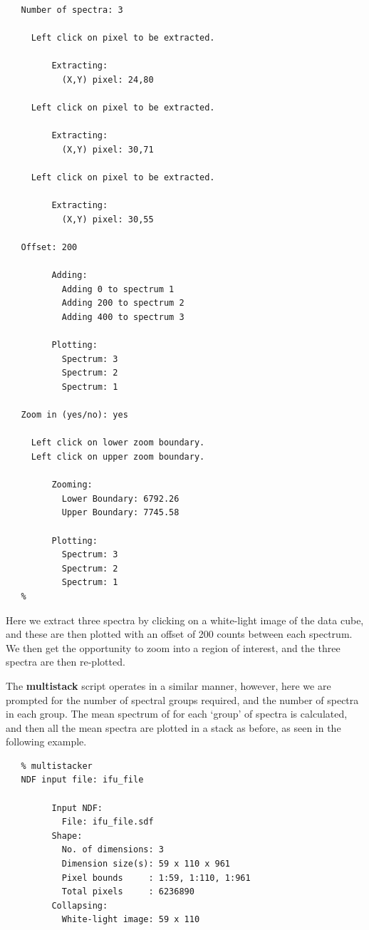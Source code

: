 \documentclass[twoside,11pt]{article}
\begin{document}
{\begin{verbatim}
   Number of spectra: 3
 
     Left click on pixel to be extracted.
 
         Extracting:
           (X,Y) pixel: 24,80
 
     Left click on pixel to be extracted.
 
         Extracting:
           (X,Y) pixel: 30,71
 
     Left click on pixel to be extracted.
 
         Extracting:
           (X,Y) pixel: 30,55
 
   Offset: 200
 
         Adding:
           Adding 0 to spectrum 1
           Adding 200 to spectrum 2
           Adding 400 to spectrum 3
 
         Plotting:
           Spectrum: 3 
           Spectrum: 2 
           Spectrum: 1 
 
   Zoom in (yes/no): yes
 
     Left click on lower zoom boundary.
     Left click on upper zoom boundary.
 
         Zooming:
           Lower Boundary: 6792.26
           Upper Boundary: 7745.58
 
         Plotting:
           Spectrum: 3
           Spectrum: 2
           Spectrum: 1
   %
\end{verbatim}\normalsize

Here we extract three spectra by clicking on a white-light image of
the data cube, and these are then plotted with an offset of 200 counts
between each spectrum.  We then get the opportunity to zoom into a
region of interest, and the three spectra are then re-plotted.

The {\bf multistack} script operates in a similar manner, however, here
we are prompted for the number of spectral groups required, and the
number of spectra in each group.  The mean spectrum of for each
`group' of spectra is calculated, and then all the mean spectra are
plotted in a stack as before, as seen in the following example. 

\small\begin{verbatim}
   % multistacker
   NDF input file: ifu_file
 
         Input NDF:
           File: ifu_file.sdf
         Shape:
           No. of dimensions: 3
           Dimension size(s): 59 x 110 x 961
           Pixel bounds     : 1:59, 1:110, 1:961
           Total pixels     : 6236890
         Collapsing:
           White-light image: 59 x 110
  

\end{verbatim}}
\end{document}
